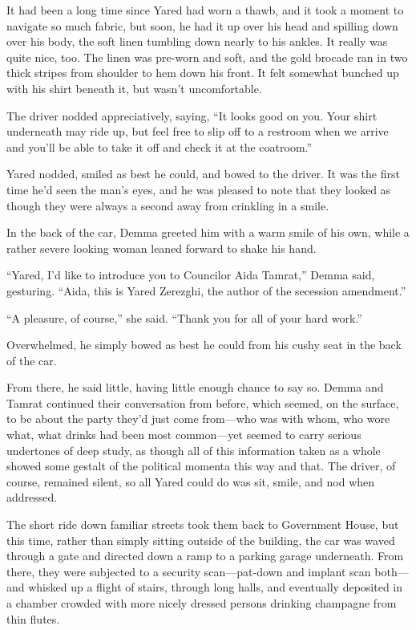 It had been a long time since Yared had worn a thawb, and it took a moment to navigate so much fabric, but soon, he had it up over his head and spilling down over his body, the soft linen tumbling down nearly to his ankles. It really was quite nice, too. The linen was pre-worn and soft, and the gold brocade ran in two thick stripes from shoulder to hem down his front. It felt somewhat bunched up with his shirt beneath it, but wasn't uncomfortable.

The driver nodded appreciatively, saying, ``It looks good on you. Your shirt underneath may ride up, but feel free to slip off to a restroom when we arrive and you'll be able to take it off and check it at the coatroom.''

Yared nodded, smiled as best he could, and bowed to the driver. It was the first time he'd seen the man's eyes, and he was pleased to note that they looked as though they were always a second away from crinkling in a smile.

In the back of the car, Demma greeted him with a warm smile of his own, while a rather severe looking woman leaned forward to shake his hand.

``Yared, I'd like to introduce you to Councilor Aida Tamrat,'' Demma said, gesturing. ``Aida, this is Yared Zerezghi, the author of the secession amendment.''

``A pleasure, of course,'' she said. ``Thank you for all of your hard work.''

Overwhelmed, he simply bowed as best he could from his cushy seat in the back of the car.

From there, he said little, having little enough chance to say so. Demma and Tamrat continued their conversation from before, which seemed, on the surface, to be about the party they'd just come from---who was with whom, who wore what, what drinks had been most common---yet seemed to carry serious undertones of deep study, as though all of this information taken as a whole showed some gestalt of the political momenta this way and that. The driver, of course, remained silent, so all Yared could do was sit, smile, and nod when addressed.

The short ride down familiar streets took them back to Government House, but this time, rather than simply sitting outside of the building, the car was waved through a gate and directed down a ramp to a parking garage underneath. From there, they were subjected to a security scan---pat-down and implant scan both---and whisked up a flight of stairs, through long halls, and eventually deposited in a chamber crowded with more nicely dressed persons drinking champagne from thin flutes.

